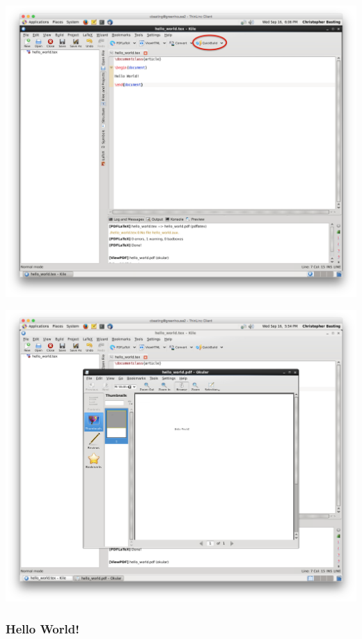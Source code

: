 \begin{frame}
	\includegraphics[width=\textwidth]{screenshots/kile-quickbuild.png}
\end{frame}

\begin{frame}
	\includegraphics[width=\textwidth]{screenshots/kile-quickbuild-2.png}
\end{frame}

\begin{frame}[fragile]
	\frametitle{Hello World!}
	
\end{frame}

